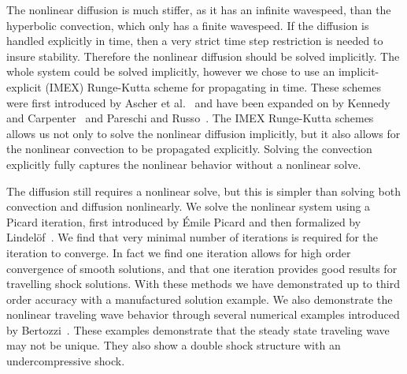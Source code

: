   The nonlinear diffusion is much stiffer, as it has an infinite wavespeed, than the
  hyperbolic convection, which only has a finite wavespeed.
  If the diffusion is handled explicitly in time, then a very strict time step
  restriction is needed to insure stability.
  Therefore the nonlinear diffusion should be solved implicitly.
  The whole system could be solved implicitly, however we chose to use an
  implicit-explicit (IMEX) Runge-Kutta scheme for propagating in time.
  These schemes were first introduced by Ascher et al.~\cite{article:ascher1997implicit}
  and have been expanded on by Kennedy and Carpenter~\cite{kennedy2003additive} and
  Pareschi and Russo~\cite{article:pareschi2000IMEX}.
  The IMEX Runge-Kutta schemes allows us not only to solve the nonlinear diffusion
  implicitly, but it also allows for the nonlinear convection to be propagated
  explicitly.
  Solving the convection explicitly fully captures the nonlinear behavior without a
  nonlinear solve.

  The diffusion still requires a nonlinear solve, but this is simpler than solving both
  convection and diffusion nonlinearly.
  We solve the nonlinear system using a Picard iteration, first introduced by {\'E}mile
  Picard and then formalized by Lindel{\"o}f~\cite{lindelof1894application}.
  We find that very minimal number of iterations is required for the iteration to
  converge.
  In fact we find one iteration allows for high order convergence of smooth solutions,
  and that one iteration provides good results for travelling shock solutions.
  With these methods we have demonstrated up to third order accuracy with a manufactured
  solution example.
  We also demonstrate the nonlinear traveling wave behavior through several numerical
  examples introduced by Bertozzi~\cite{article:Bertozzi1999}.
  These examples demonstrate that the steady state traveling wave may not be unique.
  They also show a double shock structure with an undercompressive shock.